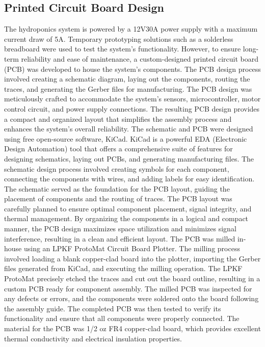 \documentclass[12pt]{article}
\begin{document}
\subsection{Printed Circuit Board Design}
\noindent The hydroponics system is powered by a 12V30A power supply with a maximum current draw of 5A. Temporary prototyping solutions such as a solderless breadboard were used to test the system's functionality. However, to ensure long-term reliability and ease of maintenance, a custom-designed printed circuit board (PCB) was developed to house the system's components. The PCB design process involved creating a schematic diagram, laying out the components, routing the traces, and generating the Gerber files for manufacturing. The PCB design was meticulously crafted to accommodate the system's sensors, microcontroller, motor control circuit, and power supply connections. The resulting PCB design provides a compact and organized layout that simplifies the assembly process and enhances the system's overall reliability.
\newline
\newline
\noindent The schematic and PCB were designed using free open-source software, KiCad. KiCad is a powerful EDA (Electronic Design Automation) tool that offers a comprehensive suite of features for designing schematics, laying out PCBs, and generating manufacturing files. The schematic design process involved creating symbols for each component, connecting the components with wires, and adding labels for easy identification. The schematic served as the foundation for the PCB layout, guiding the placement of components and the routing of traces. The PCB layout was carefully planned to ensure optimal component placement, signal integrity, and thermal management. By organizing the components in a logical and compact manner, the PCB design maximizes space utilization and minimizes signal interference, resulting in a clean and efficient layout.
\newline
\newline
\noindent The PCB was milled in-house using an LPKF ProtoMat Circuit Board Plotter. The milling process involved loading a blank copper-clad board into the plotter, importing the Gerber files generated from KiCad, and executing the milling operation. The LPKF ProtoMat precisely etched the traces and cut out the board outline, resulting in a custom PCB ready for component assembly. The milled PCB was inspected for any defects or errors, and the components were soldered onto the board following the assembly guide. The completed PCB was then tested to verify its functionality and ensure that all components were properly connected. The material for the PCB was 1/2 oz FR4 copper-clad board, which provides excellent thermal conductivity and electrical insulation properties.
\end{document}
